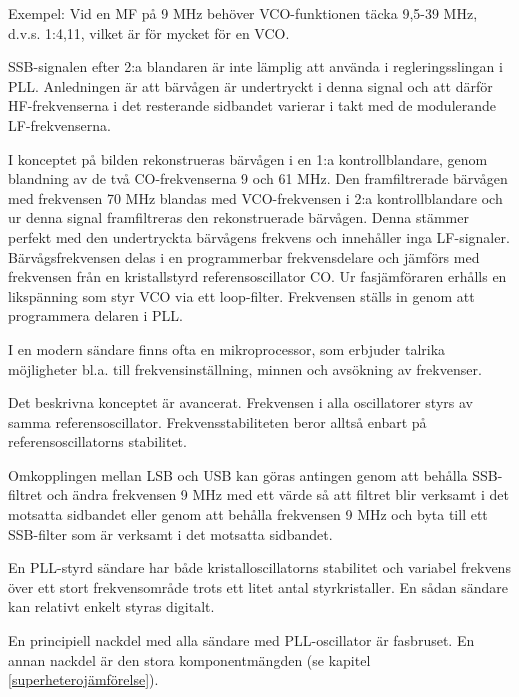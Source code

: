 Exempel: Vid en MF på 9 MHz behöver VCO-funktionen täcka 9,5-39 MHz,
d.v.s. 1:4,11, vilket är för mycket för en VCO.

SSB-signalen efter 2:a blandaren är inte lämplig att använda i
regleringsslingan i PLL. Anledningen är att bärvågen är undertryckt i
denna signal och att därför HF-frekvenserna i det resterande sidbandet
varierar i takt med de modulerande LF-frekvenserna.

I konceptet på bilden rekonstrueras bärvågen i en 1:a
kontrollblandare, genom blandning av de två CO-frekvenserna 9 och 61
MHz. Den framfiltrerade bärvågen med frekvensen 70 MHz blandas med
VCO-frekvensen i 2:a kontrollblandare och ur denna signal
framfiltreras den rekonstruerade bärvågen. Denna stämmer perfekt med
den undertryckta bärvågens frekvens och innehåller inga
LF-signaler. Bärvågsfrekvensen delas i en programmerbar frekvensdelare
och jämförs med frekvensen från en kristallstyrd referensoscillator
CO. Ur fasjämföraren erhålls en likspänning som styr VCO via ett
loop-filter. Frekvensen ställs in genom att programmera delaren i PLL.

I en modern sändare finns ofta en mikroprocessor, som erbjuder talrika
möjligheter bl.a. till frekvensinställning, minnen och avsökning av
frekvenser.

Det beskrivna konceptet är avancerat.  Frekvensen i alla oscillatorer
styrs av samma referensoscillator. Frekvensstabiliteten beror alltså
enbart på referensoscillatorns stabilitet.

Omkopplingen mellan LSB och USB kan göras antingen genom att behålla
SSB-filtret och ändra frekvensen 9 MHz med ett värde så att filtret
blir verksamt i det motsatta sidbandet eller genom att behålla
frekvensen 9 MHz och byta till ett SSB-filter som är verksamt i det
motsatta sidbandet.

En PLL-styrd sändare har både kristalloscillatorns stabilitet och
variabel frekvens över ett stort frekvensområde trots ett litet antal
styrkristaller. En sådan sändare kan relativt enkelt styras digitalt.

En principiell nackdel med alla sändare med PLL-oscillator är
fasbruset. En annan nackdel är den stora komponentmängden
(se kapitel \ref{superheterojämförelse}).
